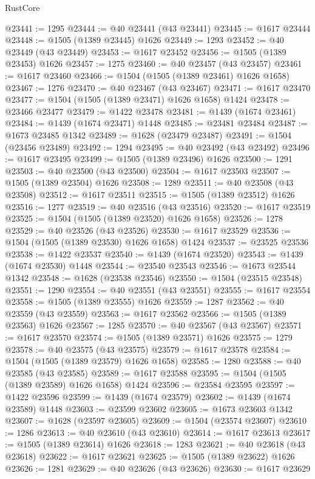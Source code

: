 \begin{lexlean}{RustCore}
\begin{coremodule}
@23441 := 1295
@23444 := @40 @23441 (@43 @23441)
@23445 := @1617 @23444
@23448 := @1505 (@1389 @23445) @1626
@23449 := 1293
@23452 := @40 @23449 (@43 @23449)
@23453 := @1617 @23452
@23456 := @1505 (@1389 @23453) @1626
@23457 := 1275
@23460 := @40 @23457 (@43 @23457)
@23461 := @1617 @23460
@23466 := @1504 (@1505 (@1389 @23461) @1626 @1658)
@23467 := 1276
@23470 := @40 @23467 (@43 @23467)
@23471 := @1617 @23470
@23477 := @1504 (@1505 (@1389 @23471) @1626 @1658) @1424
@23478 := @23466 @23477
@23479 := @1422 @23478
@23481 := @1439 (@1674 @23461)
@23484 := @1439 (@1674 @23471) @1448
@23485 := @23481 @23484
@23487 := @1673 @23485 @1342
@23489 := @1628 (@23479 @23487)
@23491 := @1504 (@23456 @23489)
@23492 := 1294
@23495 := @40 @23492 (@43 @23492)
@23496 := @1617 @23495
@23499 := @1505 (@1389 @23496) @1626
@23500 := 1291
@23503 := @40 @23500 (@43 @23500)
@23504 := @1617 @23503
@23507 := @1505 (@1389 @23504) @1626
@23508 := 1289
@23511 := @40 @23508 (@43 @23508)
@23512 := @1617 @23511
@23515 := @1505 (@1389 @23512) @1626
@23516 := 1277
@23519 := @40 @23516 (@43 @23516)
@23520 := @1617 @23519
@23525 := @1504 (@1505 (@1389 @23520) @1626 @1658)
@23526 := 1278
@23529 := @40 @23526 (@43 @23526)
@23530 := @1617 @23529
@23536 := @1504 (@1505 (@1389 @23530) @1626 @1658) @1424
@23537 := @23525 @23536
@23538 := @1422 @23537
@23540 := @1439 (@1674 @23520)
@23543 := @1439 (@1674 @23530) @1448
@23544 := @23540 @23543
@23546 := @1673 @23544 @1342
@23548 := @1628 (@23538 @23546)
@23550 := @1504 (@23515 @23548)
@23551 := 1290
@23554 := @40 @23551 (@43 @23551)
@23555 := @1617 @23554
@23558 := @1505 (@1389 @23555) @1626
@23559 := 1287
@23562 := @40 @23559 (@43 @23559)
@23563 := @1617 @23562
@23566 := @1505 (@1389 @23563) @1626
@23567 := 1285
@23570 := @40 @23567 (@43 @23567)
@23571 := @1617 @23570
@23574 := @1505 (@1389 @23571) @1626
@23575 := 1279
@23578 := @40 @23575 (@43 @23575)
@23579 := @1617 @23578
@23584 := @1504 (@1505 (@1389 @23579) @1626 @1658)
@23585 := 1280
@23588 := @40 @23585 (@43 @23585)
@23589 := @1617 @23588
@23595 := @1504 (@1505 (@1389 @23589) @1626 @1658) @1424
@23596 := @23584 @23595
@23597 := @1422 @23596
@23599 := @1439 (@1674 @23579)
@23602 := @1439 (@1674 @23589) @1448
@23603 := @23599 @23602
@23605 := @1673 @23603 @1342
@23607 := @1628 (@23597 @23605)
@23609 := @1504 (@23574 @23607)
@23610 := 1286
@23613 := @40 @23610 (@43 @23610)
@23614 := @1617 @23613
@23617 := @1505 (@1389 @23614) @1626
@23618 := 1283
@23621 := @40 @23618 (@43 @23618)
@23622 := @1617 @23621
@23625 := @1505 (@1389 @23622) @1626
@23626 := 1281
@23629 := @40 @23626 (@43 @23626)
@23630 := @1617 @23629

\end{coremodule}
\end{lexlean}
